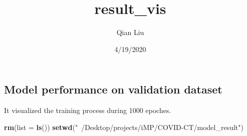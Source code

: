 \documentclass[]{article}
\title{result\_vis}
\author{Qian Liu}
\date{4/19/2020}
\newenvironment{Shaded}{\begin{snugshade}}{\end{snugshade}}
\newcommand{\KeywordTok}[1]{\textcolor[rgb]{0.13,0.29,0.53}{\textbf{#1}}}
\newcommand{\DataTypeTok}[1]{\textcolor[rgb]{0.13,0.29,0.53}{#1}}
\newcommand{\StringTok}[1]{\textcolor[rgb]{0.31,0.60,0.02}{#1}}
\newcommand{\NormalTok}[1]{#1}
\begin{document}
\maketitle

\subsection{Model performance on validation
dataset}\label{model-performance-on-validation-dataset}

It visualized the training process during 1000 epoches.

\begin{Shaded}
\begin{Highlighting}[]
\KeywordTok{rm}\NormalTok{(}\DataTypeTok{list =} \KeywordTok{ls}\NormalTok{())}
\KeywordTok{setwd}\NormalTok{(}\StringTok{"~/Desktop/projects/iMP/COVID-CT/model_result"}\NormalTok{)}


\end{Highlighting}
\end{Shaded}
\end{document}
